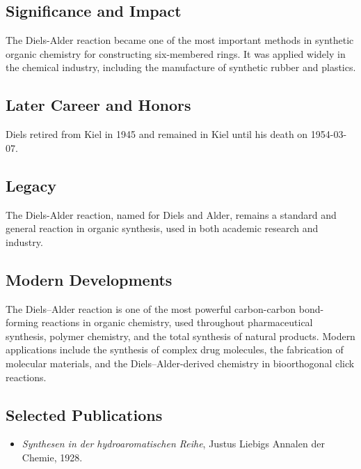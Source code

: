 \subsection*{Significance and Impact}

The Diels-Alder reaction became one of the most important methods in synthetic organic chemistry for constructing six-membered rings. It was applied widely in the chemical industry, including the manufacture of synthetic rubber and plastics.

\subsection*{Later Career and Honors}

Diels retired from Kiel in 1945 and remained in Kiel until his death on 1954-03-07.

\subsection*{Legacy}

The Diels-Alder reaction, named for Diels and Alder, remains a standard and general reaction in organic synthesis, used in both academic research and industry.

\subsection*{Modern Developments}

The Diels–Alder reaction is one of the most powerful carbon-carbon bond-forming reactions in organic chemistry, used throughout pharmaceutical synthesis, polymer chemistry, and the total synthesis of natural products. Modern applications include the synthesis of complex drug molecules, the fabrication of molecular materials, and the Diels–Alder-derived chemistry in bioorthogonal click reactions.

\subsection*{Selected Publications}

\begin{itemize}

\item \emph{Synthesen in der hydroaromatischen Reihe}, Justus Liebigs Annalen der Chemie, 1928.

\end{itemize}

\clearpage

